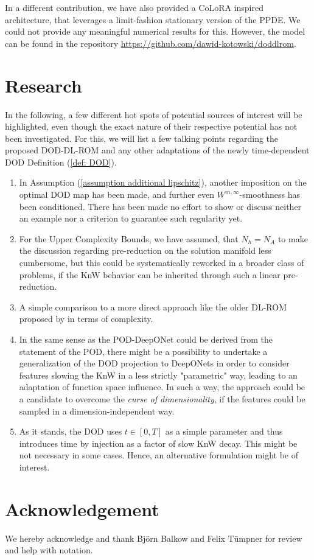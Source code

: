 In a different contribution, we have also provided a CoLoRA inspired architecture, that leverages a limit-fashion 
stationary version of the PPDE. We could not provide any meaningful numerical results for this. However, 
the model can be found in the repository \url{https://github.com/dawid-kotowski/doddlrom}.


\section{Research}


In the following, a few different hot spots of potential sources of interest will be highlighted, even though
the exact nature of their respective potential has not been investigated.
For this, we will list a few talking points regarding the proposed DOD-DL-ROM and any other
adaptations of the newly time-dependent DOD Definition (\ref{def: DOD}).
\begin{enumerate}
    \item[-] In Assumption (\ref{assumption additional lipschitz}), another imposition on the optimal DOD map
    has been made, and further even $W^{m, \infty}$-smoothness
    has been conditioned. There has been made no effort to show or discuss neither an example nor a criterion 
    to guarantee such regularity yet.
    \item[-] For the Upper Complexity Bounds, we have assumed, that $N_h = N_A$ to make the discussion regarding
    pre-reduction on the solution manifold less cumbersome, but this could be systematically reworked in a 
    broader class of problems, if the KnW behavior can be inherited through such a linear pre-reduction.
    \item[-] A simple comparison to a more direct approach like the older DL-ROM proposed by \cite{fresca2020} in
    terms of complexity.
    \item[-] In the same sense as the POD-DeepONet could be derived from the statement of the POD, there might
    be a possibility to undertake a generalization of the DOD projection to DeepONets in order to consider features slowing
    the KnW in a less strictly "parametric" way, leading to an adaptation of function space influence. 
    In such a way, the approach could be a candidate to overcome the \emph{curse of dimensionality}, if the
    features could be sampled in a dimension-independent way.
    \item[-] As it stands, the DOD uses $t \in [0, T]$ as a simple parameter and thus introduces time by
    injection as a factor of slow KnW decay. This might be not necessary in some cases. Hence, an alternative
    formulation might be of interest.
\end{enumerate}


\section*{Acknowledgement}

We hereby acknowledge and thank Björn Balkow and Felix Tümpner for review and help with notation.